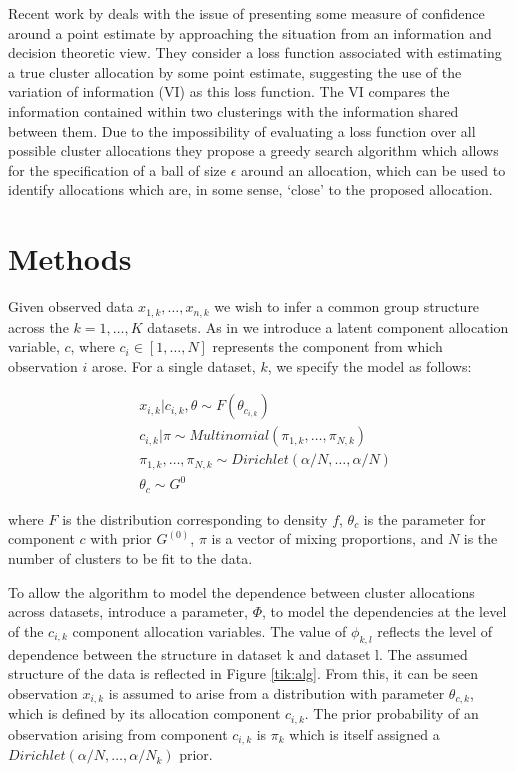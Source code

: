\documentclass[10pt,a4paper]{article}
\begin{document}
Recent work by \citeauthor{wade2015bayesian}\cite{wade2015bayesian} deals with the issue of presenting some measure of confidence around a point estimate by approaching the situation from an information and decision theoretic view. They consider a loss function associated with estimating a true cluster allocation by some point estimate, suggesting the use of the variation of information (VI) as this loss function. The VI compares the information contained within two clusterings with the information shared between them. Due to the impossibility of evaluating a loss function over all possible cluster allocations they propose a greedy search algorithm which allows for the specification of a ball of size $\epsilon$ around an allocation, which can be used to identify allocations which are, in some sense, `close' to the proposed allocation.


\section{Methods}
\label{sec:methods}
Given observed data $x_{1, k}, \dots, x_{n,k}$ we wish to infer a common group structure across the $k = 1,\dots,K$ datasets. As in \cite{kirk2012bayesian} we introduce a latent component allocation variable, $c$, where $c_i \in [1, \dots, N]$ represents the component from which observation $i$ arose. For a single dataset, $k$, we specify the model as follows:

\begin{equation}
\begin{split}
& x_{i, k}|c_{i, k},\theta \sim F(\theta_{c_{i, k}})\\ 
& c_{i,k}|\pi \sim Multinomial(\pi_{1,k}, \dots, \pi_{N,k}) \\
& \pi_{1,k}, \dots, \pi_{N,k} \sim Dirichlet(\alpha/N, \dots, \alpha/N) \\
& \theta_c \sim G^0
\end{split}
\end{equation}

\noindent
where $F$ is the distribution corresponding to density $f$, $\theta_c$ is the parameter for component $c$ with prior $G^{(0)}$, $\pi$ is a vector of mixing proportions, and $N$ is the number of clusters to be fit to the data. 

To allow the algorithm to model the dependence between cluster allocations across datasets,  introduce a parameter, $\Phi$, to model the dependencies at the level of the $c_{i,k}$ component allocation variables. The value of $\phi_{k,l}$ reflects the level of dependence between the structure in dataset k and dataset l. The assumed structure of the data is reflected in Figure \ref{tik:alg}. From this, it can be seen observation $x_{i,k}$ is assumed to arise from a distribution with parameter $\theta_{c, k}$, which is defined by its allocation component $c_{i, k}$. The prior probability of an observation arising from component $c_{i, k}$ is $\pi_k$ which is itself assigned a $ Dirichlet(\alpha/N, \dots, \alpha/N_k)$ prior.
\end{document}
